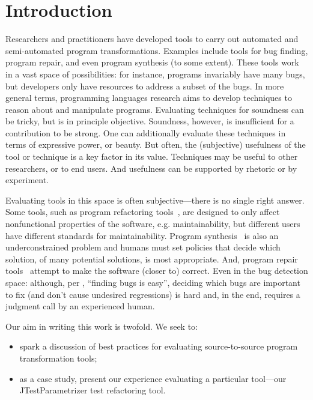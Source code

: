 \section{Introduction}
Researchers and practitioners have developed tools to carry out
automated and semi-automated program transformations.  Examples
include tools for bug finding, program repair, and even 
program synthesis (to some extent). These tools work in a vast space of possibilities:
for instance, programs invariably have many bugs, but developers only have resources
to address a subset of the bugs.
In more general terms, programming languages research aims to develop
techniques to reason about and manipulate programs. Evaluating
techniques for soundness can be tricky, but is in principle
objective. Soundness, however, is insufficient for a contribution to
be strong. One can additionally evaluate these techniques in terms of
expressive power, or beauty. But often, the (subjective) usefulness of the tool or technique
is a key factor in its value. Techniques may be useful to other researchers, or to
end users. And usefulness can be supported by rhetoric or by
experiment. 

Evaluating tools in this space is often subjective---there is no
single right answer. Some tools, such as program refactoring tools~\cite{ivers22:_indus_cry_tools_suppor_large_scale_refac},
are designed to only affect nonfunctional properties of the
software, e.g. maintainability, but different users have
different standards for maintainability. Program synthesis~\cite{solar-lezama08:_progr_synth_sketc} is also an
underconstrained problem and humans must set policies that decide which solution, of many
potential solutions, is most appropriate. And, program repair
tools~\cite{griesmayer06:_repair_boolean_progr_applic_c} 
attempt to make the software (closer to) correct. Even in 
the bug detection space: although, per 
, ``finding bugs is
easy'', deciding which bugs are
important to fix (and don't cause undesired regressions) is hard and,
in the end, requires a judgment call by an experienced human.

Our aim in writing this work is twofold. We seek to:
\begin{itemize}
\item spark a discussion of best practices for evaluating
source-to-source program transformation tools;
\item as a case study, present our experience evaluating a particular 
tool---our JTestParametrizer test refactoring tool.
\end{itemize}

